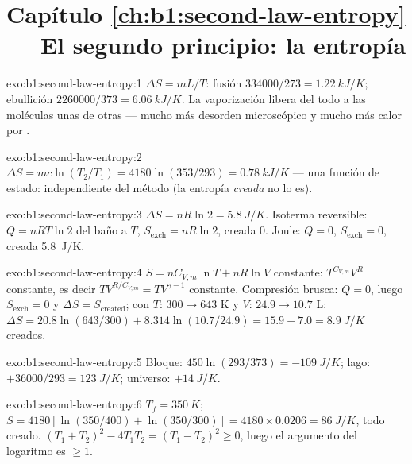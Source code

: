 \section*{Capítulo \ref{ch:b1:second-law-entropy} --- El segundo principio: la entropía}

\begin{solution}{exo:b1:second-law-entropy:1}
$\Delta S = mL/T$: fusión $334000/273 = \qty{1.22}{kJ/K}$; ebullición $2260000/
373 = \qty{6.06}{kJ/K}$. La vaporización libera del todo a las moléculas
unas de otras --- mucho más desorden microscópico y mucho más calor por
.
\end{solution}

\begin{solution}{exo:b1:second-law-entropy:2}
$\Delta S = mc\ln(T_2/T_1) = 4180\ln(353/293) = \qty{0.78}{kJ/K}$ --- una función
de estado: independiente del método (la entropía \emph{creada} no lo es).
\end{solution}

\begin{solution}{exo:b1:second-law-entropy:3}
$\Delta S = nR\ln2 = \qty{5.8}{J/K}$. Isoterma reversible: $Q = nRT\ln2$
del baño a $T$, $S_{\mathrm{exch}} = nR\ln2$, creada $0$. Joule:
$Q = 0$, $S_{\mathrm{exch}} = 0$, creada \qty{5.8}{J/K}.
\end{solution}

\begin{solution}{exo:b1:second-law-entropy:4}
$S = nC_{V,m}\ln T + nR\ln V$ constante: $T^{C_{V,m}}V^R$ constante, es decir
$TV^{R/C_{V,m}} = TV^{\gamma - 1}$ constante. Compresión brusca: $Q = 0$, luego
$S_{\mathrm{exch}} = 0$ y $\Delta S = S_{\mathrm{created}}$; con $T$: $300 \to
643$ K y $V$: $24.9 \to 10.7$ L: $\Delta S = 20.8\ln(643/300) + 8.314\ln(10.7/
24.9) = 15.9 - 7.0 = \qty{+8.9}{J/K}$ creados.
\end{solution}

\begin{solution}{exo:b1:second-law-entropy:5}
Bloque: $450\ln(293/373) = \qty{-109}{J/K}$; lago: $+36000/293 = \qty{+123}{J/K}$;
universo: $+\qty{14}{J/K}$.
\end{solution}

\begin{solution}{exo:b1:second-law-entropy:6}
$T_f = \qty{350}{K}$; $S = 4180[\ln(350/400) + \ln(350/300)] = 4180 \times
0.0206 = \qty{86}{J/K}$, todo creado. $(T_1 + T_2)^2 - 4T_1T_2 = (T_1 - T_2)^2
\geq 0$, luego el argumento del logaritmo es $\geq 1$.
\end{solution}

